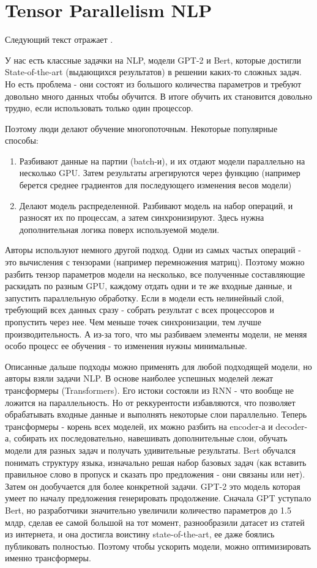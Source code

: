 \section{Tensor Parallelism NLP}

Следующий текст отражает \cite{shoeybi2019megatron}.

У нас есть классные задачки на NLP, модели GPT-2 и Bert, которые достигли State-of-the-art (выдающихся результатов) в решении каких-то сложных задач. Но есть проблема - они состоят из большого количества параметров и требуют довольно много данных чтобы обучится. В итоге обучить их становится довольно трудно, если использовать только один процессор.

Поэтому люди делают обучение многопоточным. Некоторые популярные способы: 
\begin{enumerate}
    \item Разбивают данные на партии (batch-и), и их отдают модели параллельно на несколько GPU. Затем результаты агрегируются через функцию (например берется среднее градиентов для последующего изменения весов модели)
    \item  Делают модель распределенной. Разбивают модель на набор операций, и разносят их по процессам, а затем синхронизируют. Здесь нужна дополнительная логика поверх используемой модели. 
\end{enumerate}
Авторы используют немного другой подход. Одни из самых частых операций - это вычисления с тензорами (например перемножения матриц). Поэтому можно разбить тензор параметров модели на несколько, все полученные составляющие раскидать по разным GPU, каждому отдать одни и те же входные данные, и запустить параллельную обработку. Если в модели есть нелинейный слой, требующий всех данных сразу - собрать результат с всех процессоров и пропустить через нее. Чем меньше точек синхронизации, тем лучше производительность. А из-за того, что мы разбиваем элементы модели, не меняя особо процесс ее обучения - то изменения нужны минимальные.

Описанные дальше подходы можно применять для любой подходящей модели, но авторы взяли задачи NLP. В основе наиболее успешных моделей лежат трансформеры (Transformers). Его истоки состояли из RNN - что вообще не ложится на параллельность. Но \cite{vaswani2017attention} от реккурентости избавляются, что позволяет обрабатывать входные данные и выполнять некоторые слои параллельно. Теперь трансформеры - корень всех моделей, их можно разбить на encoder-а и decoder-а, собирать их последовательно, навешивать дополнительные слои, обучать модели для разных задач и получать удивительные результаты. Bert обучался понимать структуру языка, изначально решая набор базовых задач (как вставить правильное слово в пропуск и сказать про предложения - они связаны или нет). Затем он дообучается для более конкретной задачи. GPT-2 это модель которая умеет по началу предложения генерировать продолжение. Сначала GPT уступало Bert, но разработчики значительно увеличили количество параметров до 1.5 млдр, сделав ее самой большой на тот момент, разнообразили датасет из статей из интернета, и она достигла воистину state-of-the-art, ее даже боялись публиковать полностью. Поэтому чтобы ускорить модели, можно оптимизировать именно трансформеры.

